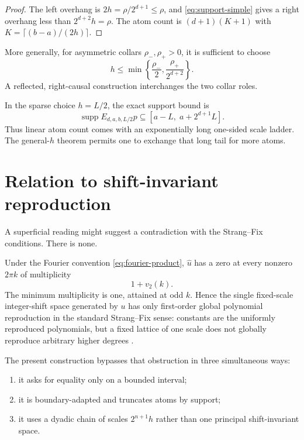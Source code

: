 \documentclass[11pt]{article}
\theoremstyle{definition}
\theoremstyle{remark}
\DeclareMathOperator{\supp}{supp}
\newcommand{\1}{\mathbf{1}}
\begin{document}
\begin{proof}
The left overhang is $2h=\rho/2^{d+1}\leq\rho$, and
\eqref{eq:support-simple} gives a right overhang less than $2^{d+2}h=\rho$.
The atom count is $(d+1)(K+1)$ with
$K=\lceil(b-a)/(2h)\rceil$.
\end{proof}

More generally, for asymmetric collars $\rho_-,\rho_+>0$, it is sufficient to
choose
\begin{equation}
 h\leq\min\left\{\frac{\rho_-}{2},
 \frac{\rho_+}{2^{d+2}}\right\}.
 \label{eq:asymmetric-h}
\end{equation}
A reflected, right-causal construction interchanges the two collar roles.

In the sparse choice $h=L/2$, the exact support bound is
\begin{equation}
 \supp E_{d,a,b,L/2}p
 \subseteq[a-L,\;a+2^{d+1}L].
 \label{eq:sparse-support}
\end{equation}
Thus linear atom count comes with an exponentially long one-sided scale ladder.
The general-$h$ theorem permits one to exchange that long tail for more atoms.

\section{Relation to shift-invariant reproduction}

A superficial reading might suggest a contradiction with the Strang--Fix
conditions.  There is none.

Under the Fourier convention \eqref{eq:fourier-product}, $\widehat u$ has a zero
at every nonzero $2\pi k$ of multiplicity
\begin{equation}
 1+v_2(k).
 \label{eq:zero-multiplicity}
\end{equation}
The minimum multiplicity is one, attained at odd $k$.  Hence the single
fixed-scale integer-shift space generated by $u$ has only first-order global
polynomial reproduction in the standard Strang--Fix sense: constants are the
uniformly reproduced polynomials, but a fixed lattice of one scale does not
globally reproduce arbitrary higher degrees \cite{StrangFix1973,deBoorRon1992}.

The present construction bypasses that obstruction in three simultaneous ways:

\begin{enumerate}
\item it asks for equality only on a bounded interval;
\item it is boundary-adapted and truncates atoms by support;
\item it uses a dyadic chain of scales $2^{n+1}h$ rather than one principal
  shift-invariant space.
\end{enumerate}
\end{document}
